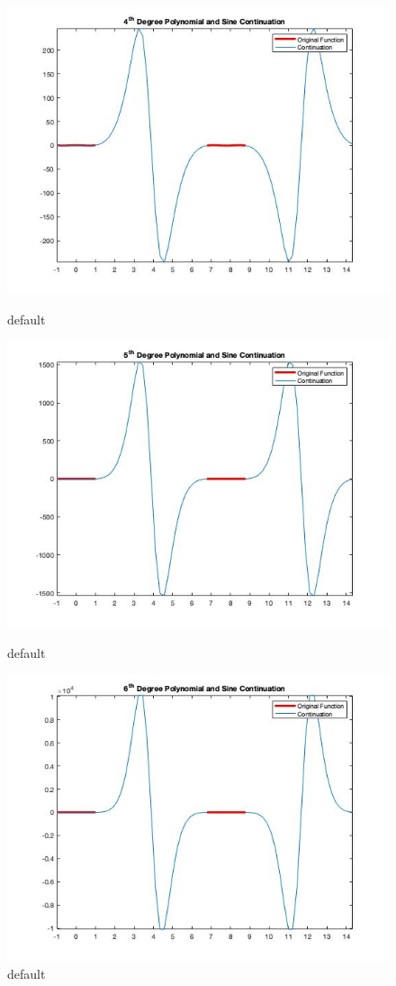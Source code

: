 \documentclass[11pt]{amsart}
\begin{document}
\begin{figure}[htbp]
\begin{center}
\includegraphics[scale=0.5]{FourthDegreeSineCont.jpg}
\caption{default}
\label{default}


\includegraphics[scale=0.5]{FifthDegreeSineCont.jpg}
\caption{default}
\label{default}


\includegraphics[scale=0.5]{SixthDegreeSineCont.jpg}
\caption{default}
\label{default}





\end{center}
\end{figure}
\end{document}
